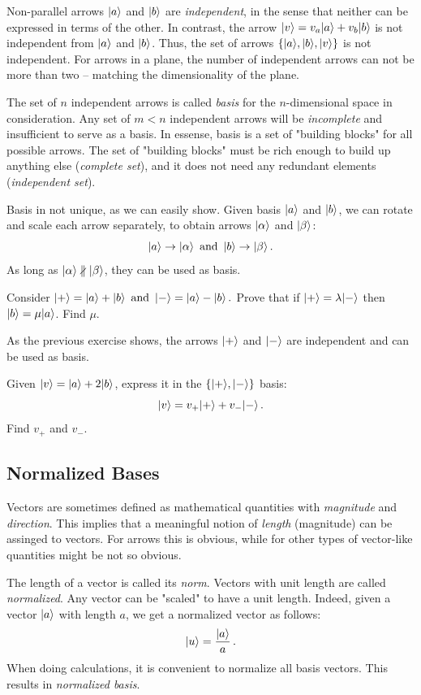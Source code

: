 Non-parallel arrows $|{a}\rangle$ and $|{b}\rangle$ are \emph{independent}, in the sense that neither can be expressed in terms of the other. In contrast, the arrow $|{v}\rangle = v_a|{a}\rangle+v_b|{b}\rangle$ is not independent from $|{a}\rangle$ and $|{b}\rangle$. Thus, the set of arrows $\lbrace |{a}\rangle, |{b}\rangle, |{v}\rangle \rbrace$ is not independent. For arrows in a plane, the number of independent arrows can not be more than two -- matching the dimensionality of the plane.

The set of $n$ independent arrows is called \emph{basis} for the $n$-dimensional space in consideration. Any set of $m < n$ independent arrows will be \emph{incomplete} and insufficient to serve as a basis. In essense, basis is a set of "building blocks" for all possible arrows. The set of "building blocks" must be rich enough to build up anything else (\emph{complete set}), and it does not need any redundant elements (\emph{independent set}).

Basis in not unique, as we can easily show. Given basis $|{a}\rangle$ and $|{b}\rangle$, we can  rotate and scale each arrow separately, to obtain arrows $|{\alpha}\rangle$ and $|{\beta}\rangle$:
\[
|{a}\rangle\to|{\alpha}\rangle\,\textrm{ and }\,|{b}\rangle\to|{\beta}\rangle\,.
\]
As long as $|{\alpha}\rangle\nparallel|{\beta}\rangle$, they can be used as basis.
\begin{exercise}
	Consider $|{+}\rangle = |{a}\rangle + |{b}\rangle\,\textrm{ and }\,|{-}\rangle=|{a}\rangle-|{b}\rangle\,.$
	Prove that if $|{+}\rangle=\lambda|{-}\rangle$ then $|{b}\rangle=\mu|{a}\rangle$. Find $\mu$.
\end{exercise}
As the previous exercise shows, the arrows $|{+}\rangle$ and $|{-}\rangle$ are independent and can be used as basis.
\begin{exercise}
	Given $|{v}\rangle=|{a}\rangle+2|{b}\rangle$, express it in the $\lbrace |{+}\rangle,|{-}\rangle\rbrace$ basis:
	\[
		|{v}\rangle=v_{+}|{+}\rangle+v_{-}|{-}\rangle\,.
	\]
	Find $v_{+}$ and $v_{-}$.
\end{exercise}

\subsection{Normalized Bases}
Vectors are sometimes defined as mathematical quantities with \emph{magnitude} and \emph{direction}. This implies that a meaningful notion of \emph{length} (magnitude) can be assinged to vectors. For arrows this is obvious, while for other types of vector-like quantities might be not so obvious. 

The length of a vector is called its \emph{norm}. Vectors with unit length are called \emph{normalized}. Any vector can be "scaled" to have a unit length. Indeed, given a vector $|{a}\rangle$ with length $a$, we get a normalized vector as follows:
\[
|{u}\rangle = \frac{|{a}\rangle}{a}\,.
\]
When doing calculations, it is convenient to normalize all basis vectors. This results in \emph{normalized basis}.

